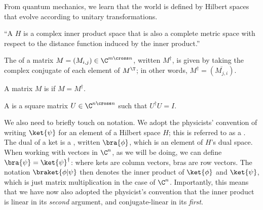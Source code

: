 From quantum mechanics, we learn that the world is defined by Hilbert spaces
that evolve according to unitary transformations.


\begin{definition}\label{def:hilbert-space}
    ``A  $H$ is a complex
  inner product space that is also a complete metric space with respect to the
  distance function induced by the inner product.''
\end{definition}

\begin{definition}\label{def:conjugate-transpose}
  The  of a matrix $M = (M_{i,j}) \in \C^{m \cross
  n}$, written $M^\dag$, is given by taking the complex conjugate of each
  element of $M^\T$; in other words, $M^\dag = (\overline{M_{j,i}})$.
\end{definition}

\begin{definition}\label{def:hermitian}
  A matrix $M$ is  if $M = M^\dag$.
\end{definition}

\begin{definition}\label{def:unitary-matrix}
  A  is a square matrix $U \in \C^{n \cross n}$ such that
  $U^\dag U = I$.
\end{definition}

We also need to briefly touch on notation.  We adopt the physicists' convention
of writing $\ket{\psi}$ for an element of a Hilbert space $H$; this is referred
to as a .  The dual of a ket is a , written $\bra{\phi}$,
which is an element of $H$'s dual space.  When working with vectors in $\C^n$,
as we will be doing, we can define $\bra{\psi} = \ket{\psi}^\dag$: where kets
are column vectors, bras are row vectors.  The notation $\braket{\phi | \psi}$
then denotes the inner product of $\ket{\phi}$ and $\ket{\psi}$, which is just
matrix multiplication in the case of $\C^n$.  Importantly, this means that we
have now also adopted the physicist's convention that the inner product is
linear in its \emph{second} argument, and conjugate-linear in its \emph{first}.

